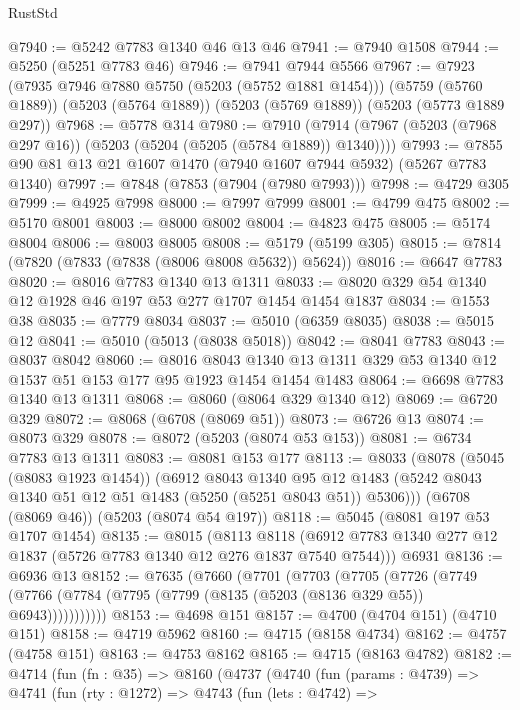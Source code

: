 \begin{lexlean}{RustStd}
\begin{coremodule}
@7940 := @5242 @7783 @1340 @46 @13 @46
@7941 := @7940 @1508
@7944 := @5250 (@5251 @7783 @46)
@7946 := @7941 @7944 @5566
@7967 := @7923
    (@7935 @7946 @7880 @5750 (@5203 (@5752 @1881 @1454)))
    (@5759 (@5760 @1889))
    (@5203 (@5764 @1889))
    (@5203 (@5769 @1889))
    (@5203 (@5773 @1889 @297))
@7968 := @5778 @314
@7980 := @7910 (@7914 (@7967 (@5203 (@7968 @297 @16)) (@5203 (@5204 (@5205 (@5784 @1889)) @1340))))
@7993 := @7855 @90 @81 @13 @21 @1607 @1470 (@7940 @1607 @7944 @5932) (@5267 @7783 @1340)
@7997 := @7848 (@7853 (@7904 (@7980 @7993)))
@7998 := @4729 @305
@7999 := @4925 @7998
@8000 := @7997 @7999
@8001 := @4799 @475
@8002 := @5170 @8001
@8003 := @8000 @8002
@8004 := @4823 @475
@8005 := @5174 @8004
@8006 := @8003 @8005
@8008 := @5179 (@5199 @305)
@8015 := @7814 (@7820 (@7833 (@7838 (@8006 @8008 @5632)) @5624))
@8016 := @6647 @7783
@8020 := @8016 @7783 @1340 @13 @1311
@8033 := @8020 @329 @54 @1340 @12 @1928 @46 @197 @53 @277 @1707 @1454 @1454 @1837
@8034 := @1553 @38
@8035 := @7779 @8034
@8037 := @5010 (@6359 @8035)
@8038 := @5015 @12
@8041 := @5010 (@5013 (@8038 @5018))
@8042 := @8041 @7783
@8043 := @8037 @8042
@8060 := @8016
    @8043
    @1340
    @13
    @1311
    @329
    @53
    @1340
    @12
    @1537
    @51
    @153
    @177
    @95
    @1923
    @1454
    @1454
    @1483
@8064 := @6698 @7783 @1340 @13 @1311
@8068 := @8060 (@8064 @329 @1340 @12)
@8069 := @6720 @329
@8072 := @8068 (@6708 (@8069 @51))
@8073 := @6726 @13
@8074 := @8073 @329
@8078 := @8072 (@5203 (@8074 @53 @153))
@8081 := @6734 @7783 @13 @1311
@8083 := @8081 @153 @177
@8113 := @8033
    (@8078
      (@5045 (@8083 @1923 @1454))
      (@6912
        @8043
        @1340
        @95
        @12
        @1483
        (@5242 @8043 @1340 @51 @12 @51 @1483 (@5250 (@5251 @8043 @51)) @5306)))
    (@6708 (@8069 @46))
    (@5203 (@8074 @54 @197))
@8118 := @5045 (@8081 @197 @53 @1707 @1454)
@8135 := @8015
    (@8113 @8118 (@6912 @7783 @1340 @277 @12 @1837 (@5726 @7783 @1340 @12 @276 @1837 @7540 @7544)))
    @6931
@8136 := @6936 @13
@8152 := @7635
    (@7660
      (@7701
        (@7703
          (@7705
            (@7726
              (@7749 (@7766 (@7784 (@7795 (@7799 (@8135 (@5203 (@8136 @329 @55)) @6943)))))))))))
@8153 := @4698 @151
@8157 := @4700 (@4704 @151) (@4710 @151)
@8158 := @4719 @5962
@8160 := @4715 (@8158 @4734)
@8162 := @4757 (@4758 @151)
@8163 := @4753 @8162
@8165 := @4715 (@8163 @4782)
@8182 := @4714
    (fun (fn : @35) =>
    @8160
      (@4737
        (@4740
          (fun (params : @4739) =>
          @4741
            (fun (rty : @1272) =>
            @4743
              (fun (lets : @4742) =>

\end{coremodule}
\end{lexlean}
